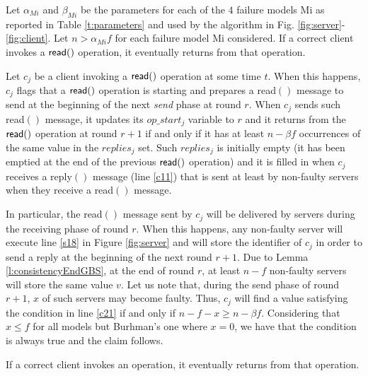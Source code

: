 \begin{lemma}\label{l:readTermination}


Let $\alpha_{Mi}$ and $\beta_{Mi}$ be the parameters for each of the $4$ failure models Mi as reported in Table \ref{t:parameters} and used by the algorithm in Fig. \ref{fig:server}-\ref{fig:client}.
Let $n > \alpha_{Mi} f$ for each failure model Mi considered. 
If a correct client invokes a ${\sf read}()$ operation, it eventually returns from that operation. 
\end{lemma}

\begin{proofL}
Let $c_j$ be a client invoking a ${\sf read}()$ operation at some time $t$. 
When this happens, $c_j$ flags that a ${\sf read}()$ operation is starting and prepares a {\sc read}$()$ message to send at the beginning of the next {\em send} phase at round $r$. 
When $c_j$ sends such {\sc read}$()$ message, it updates its $op\_start_j$ variable to $r$ and it returns from the ${\sf read}()$ operation at round $r+1$ if and only if it has at least $n-\beta f$ occurrences of the same value in the $replies_j$ set.
Such $replies_j$ is initially empty (it has been emptied at the end of the previous ${\sf read}()$ operation) and it is filled in when $c_j$ receives a {\sc reply}$()$ message (line \ref{c11}) that is sent at least by non-faulty servers when they receive a {\sc read}$()$ message.

In particular, the {\sc read}$()$ message sent by $c_j$ will be delivered by servers during the receiving phase of round $r$. When this happens, any non-faulty server will execute line \ref{s18} in Figure \ref{fig:server} and will store the identifier of $c_j$ in order to send a reply at the beginning of the next round $r+1$. 
Due to Lemma \ref{l:consistencyEndGBS}, at the end of round $r$, at least $n-f$ non-faulty servers will store the same value $v$.
Let us note that, during the send phase of round $r+1$, $x$ of such servers may become faulty.
Thus, $c_j$ will find a value satisfying the condition in line \ref{c21} if and only if $n-f-x \ge n-\beta f$.
Considering that $x\le f$ for all models but Burhman's one where $x=0$, we have that the condition is always true and the claim follows.


	
\renewcommand{\toto}{l:readTermination}
\end{proofL}

\begin{theorem}[Termination]\label{t:termination}
	If a correct client invokes an operation, it eventually returns from that operation. 
\end{theorem}

